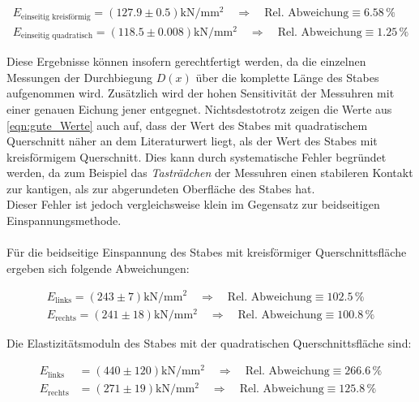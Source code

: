\begin{gather}
    E_\text{einseitig kreisförmig} = \left(127.9   \pm 0.5  \right)\unit{\kilo \newton \per \milli \meter \squared}\quad \Rightarrow \quad \text{Rel. Abweichung} \equiv 6.58\,\unit{\percent}\\
    E_\text{einseitig quadratisch} = \left(118.5   \pm 0.008\right)\unit{\kilo \newton \per \milli \meter \squared}\quad \Rightarrow \quad \text{Rel. Abweichung} \equiv 1.25\,\unit{\percent}
    \label{eqn:gute_Werte}
\end{gather}

\noindent Diese Ergebnisse können insofern gerechtfertigt werden, da die einzelnen Messungen der Durchbiegung $D(x)$ über die komplette Länge 
des Stabes aufgenommen wird. Zusätzlich wird der hohen Sensitivität der Messuhren mit einer genauen Eichung jener entgegnet.
Nichtsdestotrotz zeigen die Werte aus \eqref{eqn:gute_Werte} auch auf, dass der Wert des Stabes mit quadratischem Querschnitt näher an dem
Literaturwert liegt, als der Wert des Stabes mit kreisförmigem Querschnitt. Dies kann durch systematische Fehler begründet werden, da zum Beispiel das
\emph{Tasträdchen} der Messuhren einen stabileren Kontakt zur kantigen, als zur abgerundeten Oberfläche des Stabes hat.\\
Dieser Fehler ist jedoch vergleichsweise klein im Gegensatz zur beidseitigen Einspannungsmethode.\\\\
Für die beidseitige Einspannung des Stabes mit kreisförmiger Querschnittsfläche ergeben sich folgende Abweichungen:

\begin{gather}
\label{eqn:schlechte_Werte_k}
    E_\text{links} =   \left( 243    \pm 7\right)\unit{\kilo \newton \per \milli \meter \squared}  \quad \Rightarrow \quad \text{Rel. Abweichung} \equiv 102.5\,\unit{\percent}\\
    E_\text{rechts} =  \left( 241    \pm 18\right)\unit{\kilo \newton \per \milli \meter \squared} \quad \Rightarrow \quad \text{Rel. Abweichung} \equiv 100.8\,\unit{\percent}
\end{gather}

\noindent Die Elastizitätsmoduln des Stabes mit der quadratischen Querschnittsfläche sind:

\begin{align}
    E_\text{links} & =  \left(440 \pm 120\right) \unit{\kilo \newton \per \milli \meter \squared} \quad \Rightarrow \quad \text{Rel. Abweichung} \equiv 266.6\,\unit{\percent}\\ 
    E_\text{rechts} & = \left(271 \pm  19\right) \unit{\kilo \newton \per \milli \meter \squared} \quad \Rightarrow \quad \text{Rel. Abweichung} \equiv 125.8\,\unit{\percent}
\end{align}




